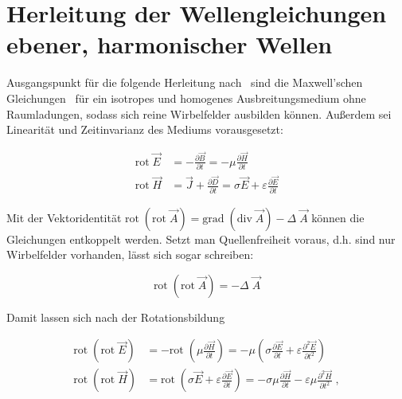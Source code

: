 \chapter{Herleitung der Wellengleichungen ebener, harmonischer Wellen}

Ausgangspunkt für die folgende Herleitung nach~\cite{EM_Schirmung} sind die Maxwell'schen Gleichungen~\cite{Maxwell} für ein isotropes und homogenes Ausbreitungsmedium ohne Raumladungen, sodass sich reine Wirbelfelder ausbilden können. Außerdem sei Linearität und Zeitinvarianz des Mediums vorausgesetzt:

\begin{subequations}
    \begin{align}
        \text{rot} \; \vec E &= - \frac{\partial \vec B}{\partial t} = - \mu \frac{\partial  \vec H}{\partial t} \\
        \text{rot} \; \vec H &= \vec J + \frac{\partial  \vec D}{\partial t} = \sigma \vec E + \varepsilon \frac{\partial  \vec E}{\partial t}
    \end{align}
\end{subequations}

Mit der Vektoridentität $\text{rot} \; (\text{rot} \; \vec A) = \text{grad} \; (\text{div} \; \vec A) - \Delta \; \vec A$ \cite{Merzinger} können die Gleichungen entkoppelt werden. Setzt man Quellenfreiheit voraus, d.h. sind nur Wirbelfelder vorhanden, lässt sich sogar schreiben:

\begin{equation}
    \text{rot} \; (\text{rot} \; \vec A) = - \Delta \; \vec A
\end{equation}

Damit lassen sich nach der Rotationsbildung 

\begin{subequations}
    \begin{align}
        \text{rot} \; (\text{rot} \; \vec E) &= - \text{rot} \; (\mu \frac{\partial  \vec H}{\partial t}) = - \mu \left(\sigma \frac{\partial  \vec E}{\partial t} + \varepsilon \frac{\partial ^2\vec E}{\partial t^2}\right) \\
        \text{rot} \; (\text{rot} \; \vec H) &= \text{rot} \; (\sigma \vec E + \varepsilon \frac{\partial  \vec E}{\partial t}) = - \sigma \mu \frac{\partial \vec H}{\partial t} - \varepsilon \mu \frac{\partial ^2 \vec H}{\partial t^2} \; ,
    \end{align}
\end{subequations}

